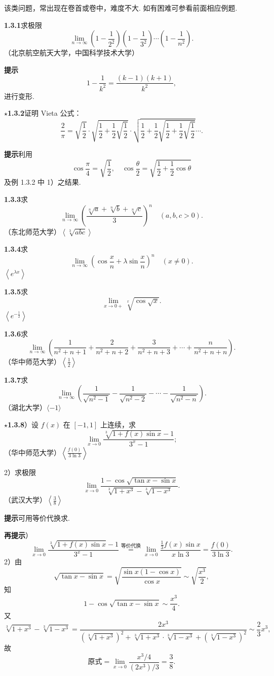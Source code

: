 \documentclass[UTF8, 12pt, fontset=fandol, oneside]{ctexart}
\begin{document}
该类问题，常出现在卷首或卷中，难度不大. 如有困难可参看前面相应例题.

\noindent\textbf{1.3.1}\quad 求极限
\[
  \lim_{n\to\infty}\left(1-\frac1{2^2}\right)
  \left(1-\frac1{3^2}\right)\cdots
  \left(1-\frac1{n^2}\right).
\]
（北京航空航天大学，中国科学技术大学）

\noindent\textbf{提示}\quad
\[
  1-\frac1{k^2}=\frac{(k-1)(k+1)}{k^2},
\]
进行变形.

\noindent\textbf{$\star$1.3.2}\quad 证明 Vieta 公式：
\[
  \frac2\pi
  =\sqrt{\frac12}\cdot
  \sqrt{\frac12+\frac12\sqrt{\frac12}}\cdot
  \sqrt{\frac12+\frac12\sqrt{\frac12+\frac12\sqrt{\frac12}}}\cdots .
\]

\noindent\textbf{提示}\quad 利用
\[
  \cos\frac\pi4=\sqrt{\frac12},\quad
  \cos\frac\theta2=\sqrt{\frac12+\frac12\cos\theta}
\]
及例 1.3.2 中 1）之结果.

\noindent\textbf{1.3.3}\quad 求
\[
  \lim_{n\to\infty}\left(\frac{\sqrt[n]{a}+\sqrt[n]{b}+\sqrt[n]{c}}3\right)^n
  \quad(a,b,c>0).
\]
（东北师范大学）\quad $\left\langle \sqrt[3]{abc}\right\rangle$

\noindent\textbf{1.3.4}\quad 求
\[
  \lim_{n\to\infty}\left(\cos\frac xn+\lambda\sin\frac xn\right)^n
  \quad(x\ne0).
\]
$\left\langle e^{\lambda x}\right\rangle$

\noindent\textbf{1.3.5}\quad 求
\[
  \lim_{x\to0+}\sqrt[x]{\cos\sqrt{x}}.
\]
$\left\langle e^{-\frac12}\right\rangle$

\noindent\textbf{1.3.6}\quad 求
\[
  \lim_{n\to\infty}\left(
  \frac1{n^2+n+1}+\frac2{n^2+n+2}+\frac3{n^2+n+3}
  +\cdots+\frac n{n^2+n+n}\right).
\]
（华中师范大学）\quad $\left\langle\frac12\right\rangle$

\noindent\textbf{1.3.7}\quad 求
\[
  \lim_{n\to\infty}\left(
  \frac1{\sqrt{n^2-1}}-\frac1{\sqrt{n^2-2}}-\cdots-\frac1{\sqrt{n^2-n}}\right).
\]
（湖北大学）\quad $\langle-1\rangle$

\noindent\textbf{$\star$1.3.8}）设 $f(x)$ 在 $[-1,1]$ 上连续，求
\[
  \lim_{x\to0}\frac{\sqrt[3]{1+f(x)\sin x}-1}{3^x-1};
\]
（华中师范大学）\quad $\left\langle\frac{f(0)}{3\ln3}\right\rangle$

2）求极限
\[
  \lim_{x\to0}\frac{1-\cos\sqrt{\tan x-\sin x}}
  {\sqrt[3]{1+x^3}-\sqrt[3]{1-x^3}}.
\]
（武汉大学）\quad $\left\langle\frac38\right\rangle$

\noindent\textbf{提示}\quad 可用等价代换求.

\noindent\textbf{再提示}）
\[
  \lim_{x\to0}\frac{\sqrt[3]{1+f(x)\sin x}-1}{3^x-1}
  \overset{\text{等价代换}}{=}
  \lim_{x\to0}\frac{\frac13f(x)\sin x}{x\ln3}
  =\frac{f(0)}{3\ln3}.
\]
2）由
\[
  \sqrt{\tan x-\sin x}
  =\sqrt{\frac{\sin x(1-\cos x)}{\cos x}}\sim\sqrt{\frac{x^3}{2}},
\]
知
\[
  1-\cos\sqrt{\tan x-\sin x}\sim\frac{x^3}{4}.
\]
又
\[
  \sqrt[3]{1+x^3}-\sqrt[3]{1-x^3}
  =\frac{2x^3}{(\sqrt[3]{1+x^3})^2+\sqrt[3]{1+x^3}\cdot\sqrt[3]{1-x^3}+(\sqrt[3]{1-x^3})^2}
  \sim\frac23x^3,
\]
故
\[
  \text{原式}=\lim_{x\to0}\frac{x^3/4}{(2x^3)/3}=\frac38.
\]
\end{document}
